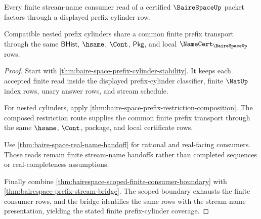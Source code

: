 \begin{theorem}
\label{thm:bairespace-finite-prefix-cylinder-coverage}
Every finite stream-name consumer read of a certified $\BaireSpaceUp$ packet
factors through a displayed prefix-cylinder row.

Compatible nested prefix cylinders share a common finite prefix transport
through the same $\mathsf{BHist}$, $\hsame$, $\Cont$, $\mathsf{Pkg}$, and local
$\NameCert_{\BaireSpaceUp}$ rows.
\end{theorem}
\begin{proof}
Start with \autoref{thm:baire-space-prefix-cylinder-stability}. It keeps each
accepted finite read inside the displayed prefix-cylinder classifier, finite
$\NatUp$ index rows, unary answer rows, and stream schedule.

For nested cylinders, apply
\autoref{thm:baire-space-prefix-restriction-composition}. The composed
restriction route supplies the common finite prefix transport through the same
$\hsame$, $\Cont$, package, and local certificate rows.

Use \autoref{thm:baire-space-real-name-handoff} for rational and real-facing
consumers. Those reads remain finite stream-name handoffs rather than
completed sequences or real-completeness assumptions.

Finally combine \autoref{thm:bairespace-scoped-finite-consumer-boundary} with
\autoref{thm:bairespace-prefix-stream-bridge}. The scoped boundary exhausts
the finite consumer rows, and the bridge identifies the same rows with the
stream-name presentation, yielding the stated finite prefix-cylinder
coverage.
\end{proof}

